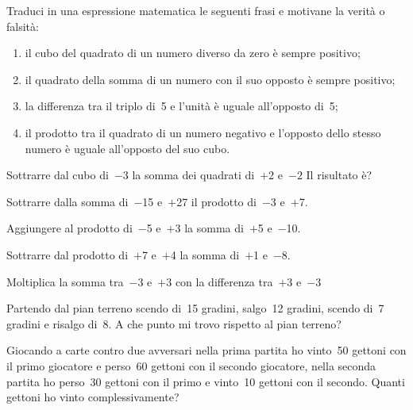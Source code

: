 \begin{multicols}{2}
\begin{esercizio}
Traduci in una espressione matematica le seguenti frasi e motivane la verità 
o 
falsità:
 \begin{enumerate}[noitemsep, label=(\alph*)]
 \item il cubo del quadrato di un numero diverso da zero è sempre positivo;
 \item il quadrato della somma di un numero con il suo opposto è sempre 
positivo;
 \item la differenza tra il triplo di~5 e l'unità è uguale all'opposto di~5;
 \item il prodotto tra il quadrato di un numero negativo e l'opposto dello 
stesso numero 
è uguale all'opposto del suo cubo.
 \end{enumerate}
\end{esercizio}

\begin{esercizio}
 Sottrarre dal cubo di~\(-3\) la somma dei quadrati di~\(+\)2 e~\(-2\) Il 
risultato è?
\end{esercizio}

\begin{esercizio}
 Sottrarre dalla somma di~\(-\)15 e~\(+\)27 il prodotto di~\(-\)3 e~\(+\)7.
\end{esercizio}

\begin{esercizio}
 Aggiungere al prodotto di~\(-\)5 e~\(+\)3 la somma di~\(+\)5 e~\(-\)10.
\end{esercizio}

\begin{esercizio}
 Sottrarre dal prodotto di~\(+\)7 e~\(+\)4 la somma di~\(+\)1 e~\(-\)8.
\end{esercizio}

\begin{esercizio}
 Moltiplica la somma tra~\(-3\) e~\(+3\) con la differenza tra~\(+3\) e~\(-3\)
\end{esercizio}

\begin{esercizio}
 Partendo dal pian terreno scendo di~15 gradini, salgo~12 gradini, scendo di~7
gradini e risalgo di~8. A che punto mi trovo rispetto al pian terreno?
\end{esercizio}

\begin{esercizio}
 Giocando a carte contro due avversari nella prima partita ho vinto~50 gettoni 
con il primo giocatore e perso~60
gettoni con il secondo giocatore, nella seconda partita ho perso~30 gettoni con 
il primo e vinto~10 gettoni
con il secondo. Quanti gettoni ho vinto complessivamente?
\end{esercizio}


\end{multicols}
